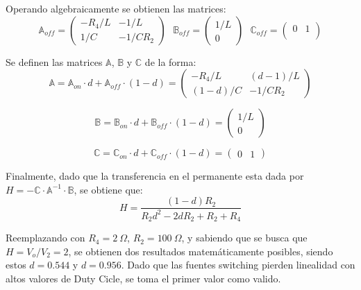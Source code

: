 Operando algebraicamente se obtienen las matrices: 
\begin{equation}
\mathbb{A}_{off} =  \begin{pmatrix}
	-R_4/L & -1/L \\
	1/C & -1/ C R_2
\end{pmatrix} \ \ \
\mathbb{B}_{off} =  \begin{pmatrix}
	1/L \\
	0
\end{pmatrix} \ \ \
\mathbb{C}_{off} =  \begin{pmatrix}
	0 & 1 \\
\end{pmatrix}
\end{equation}

Se definen las matrices $\mathbb{A}$, $\mathbb{B}$ y $\mathbb{C}$ de la forma:
\begin{equation}
\mathbb{A} = \mathbb{A}_{on} \cdot d + \mathbb{A}_{off} \cdot (1-d) =  \begin{pmatrix}
	-R_4/L & (d-1)/L \\
	(1-d)/C & -1/ C R_2
\end{pmatrix}
\end{equation}

\begin{equation}
\mathbb{B} = \mathbb{B}_{on} \cdot d + \mathbb{B}_{off} \cdot (1-d) = \begin{pmatrix}
	1/L \\
	0
\end{pmatrix}
\end{equation}

\begin{equation}
\mathbb{C} = \mathbb{C}_{on} \cdot d + \mathbb{C}_{off} \cdot (1-d) = \begin{pmatrix}
	0 & 1
\end{pmatrix}
\end{equation}

Finalmente, dado que la transferencia en el permanente esta dada por $H = -\mathbb{C} \cdot \mathbb{A}^{-1} \cdot \mathbb{B}$, se obtiene que:
\begin{equation}
H = \frac{\left( 1 - d \right) R_2}{R_2 d^2 - 2 d R_2 + R_2 + R_4}
\end{equation}

Reemplazando con $R_4 = 2 \ \Omega$, $R_2 = 100 \ \Omega$, y sabiendo que se busca que $H = V_o / V_2 = 2$, se obtienen dos resultados matemáticamente posibles, siendo estos $d = 0.544$ y $d = 0.956$. Dado que las fuentes switching pierden linealidad con altos valores de Duty Cicle, se toma el primer valor como valido.

